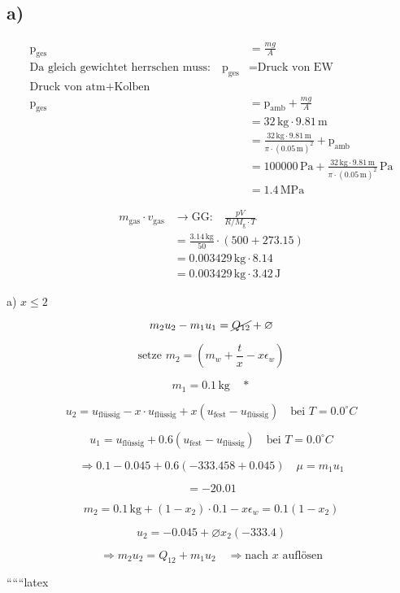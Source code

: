 

\subsection*{a)}

\begin{align*}
\text{p}_{\text{ges}} &= \frac{mg}{A} \\
\text{Da gleich gewichtet herrschen muss:} \quad \text{p}_{\text{ges}} &= \text{Druck von EW} \\
\text{Druck von atm} + \text{Kolben} \\
\text{p}_{\text{ges}} &= \text{p}_{\text{amb}} + \frac{mg}{A} \\
&= 32 \, \text{kg} \cdot 9.81 \, \text{m} \\
&= \frac{32 \, \text{kg} \cdot 9.81 \, \text{m}}{\pi \cdot (0.05 \, \text{m})^2} + \text{p}_{\text{amb}} \\
&= 100000 \, \text{Pa} + \frac{32 \, \text{kg} \cdot 9.81 \, \text{m}}{\pi \cdot (0.05 \, \text{m})^2} \, \text{Pa} \\
&= 1.4 \, \text{MPa}
\end{align*}

\begin{align*}
m_{\text{gas}} \cdot v_{\text{gas}} &\rightarrow \text{GG:} \quad \frac{pV}{R/M_{\text{g}} \cdot T} \\
&= \frac{3.14 \, \text{kg}}{50} \cdot (500 + 273.15) \\
&= 0.003429 \, \text{kg} \cdot 8.14 \\
&= 0.003429 \, \text{kg} \cdot 3.42 \, \text{J}
\end{align*}

a) \( x \leq 2 \)

\[
m_2 u_2 - m_1 u_1 = \cancel{Q_{12}} + \varnothing
\]

\[
\text{setze } m_2 = \left( m_w + \frac{t}{x} - x \epsilon_w \right)
\]

\[
m_1 = 0.1 \, \text{kg} \quad \ast
\]

\[
u_2 = u_{\text{flüssig}} - x \cdot u_{\text{flüssig}} + x \left( u_{\text{fest}} - u_{\text{flüssig}} \right) \quad \text{bei } T = 0.0^\circ C
\]

\[
u_1 = u_{\text{flüssig}} + 0.6 \left( u_{\text{fest}} - u_{\text{flüssig}} \right) \quad \text{bei } T = 0.0^\circ C
\]

\[
\Rightarrow 0.1 - 0.045 + 0.6 \left( -333.458 + 0.045 \right) \quad \mu = m_1 u_1
\]

\[
= -20.01
\]

\[
m_2 = 0.1 \, \text{kg} + \left( 1 - x_2 \right) \cdot 0.1 - x \epsilon_w = 0.1 \left( 1 - x_2 \right)
\]

\[
u_2 = -0.045 + \varnothing x_2 \left( -333.4 \right)
\]

\[
\Rightarrow m_2 u_2 = Q_{12} + m_1 u_2 \quad \Rightarrow \text{nach } x \text{ auflösen}
\]

``````latex